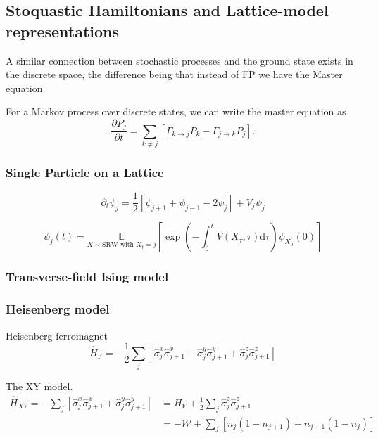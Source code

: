 \newpage
\subsection{Stoquastic Hamiltonians and Lattice-model representations}
\label{subsec:fk-latt}
A similar connection between stochastic processes and the ground state exists in the discrete space, the difference being that instead of FP we have the Master equation


For a Markov process over discrete states, we can write the master equation as 
\begin{equation}
	\frac{\partial P_{j}}{\partial t}=\sum_{k \neq j}\left[\Gamma_{k \rightarrow j} P_{k}-\Gamma_{j \rightarrow k} P_{j}\right].
\end{equation}





\subsubsection{Single Particle on a Lattice}
\begin{equation}
	\partial_{t} \psi_{j}=\frac{1}{2}\left[\psi_{j+1}+\psi_{j-1}-2 \psi_{j}\right]+V_{j} \psi_{j}
\end{equation}

\begin{equation}
	\psi_{j}(t)=\underset{X \sim \mathrm{SRW} \text { with } X_{t}=j}{\mathbb{E}} \left[\exp \left(-\int_{0}^{t}  V\left(X_{\tau}, \tau\right) \mathrm{d} \tau \right) \psi_{X_{0}}(0)\right]
\end{equation}

\subsubsection{Transverse-field Ising model}

\subsubsection{Heisenberg model}
Heisenberg ferromagnet
\begin{equation}
	\hat H_{\mathrm{F}}=-\frac{1}{2} \sum_{j}\left[\hat{\sigma}_{j}^{x} \hat{\sigma}_{j+1}^{x}+\hat{\sigma}_{j}^{y} \hat{\sigma}_{j+1}^{y}+\hat{\sigma}_{j}^{z} \hat{\sigma}_{j+1}^{z}\right]
\end{equation}

The XY model.
\begin{equation}
	\begin{aligned} 
		\hat H_{X Y}=-\sum_{j}\left[\hat{\sigma}_{j}^{x} \hat{\sigma}_{j+1}^{x}+\hat{\sigma}_{j}^{y} \hat{\sigma}_{j+1}^{y}\right] &=H_{\mathrm{F}}+\frac{1}{2} \sum_{j} \hat{\sigma}_{j}^{z} \hat{\sigma}_{j+1}^{z} \\ 						&=-\mathcal{W}+\sum_{j}\left[n_{j}\left(1-n_{j+1}\right)+n_{j+1}\left(1-n_{j}\right)\right] 
	\end{aligned}
\end{equation}

